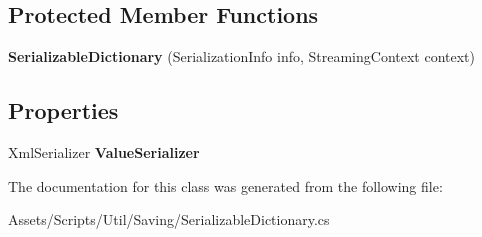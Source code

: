 \subsection*{Protected Member Functions}
\begin{DoxyCompactItemize}
\item 
{\bfseries Serializable\+Dictionary} (Serialization\+Info info, Streaming\+Context context)\hypertarget{class_util_1_1_serializable_dictionary_a4cee20b244c018189699e27424a4772d}{}\label{class_util_1_1_serializable_dictionary_a4cee20b244c018189699e27424a4772d}

\end{DoxyCompactItemize}
\subsection*{Properties}
\begin{DoxyCompactItemize}
\item 
Xml\+Serializer {\bfseries Value\+Serializer}\hypertarget{class_util_1_1_serializable_dictionary_a25936f4835bc2b4ec1695489a4a17a69}{}\label{class_util_1_1_serializable_dictionary_a25936f4835bc2b4ec1695489a4a17a69}

\end{DoxyCompactItemize}


The documentation for this class was generated from the following file\+:\begin{DoxyCompactItemize}
\item 
Assets/\+Scripts/\+Util/\+Saving/Serializable\+Dictionary.\+cs\end{DoxyCompactItemize}

